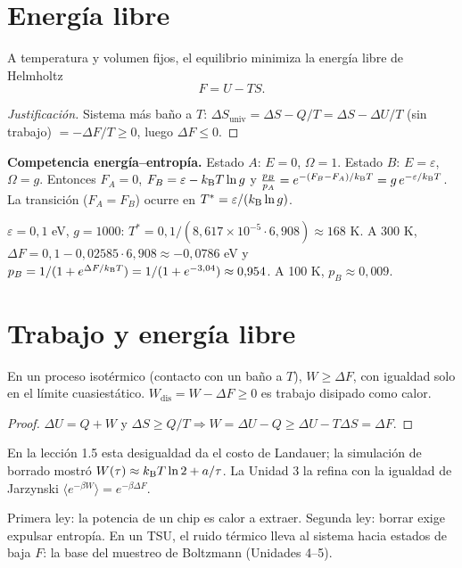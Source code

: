\documentclass[11pt,a4paper]{article}
\begin{document}
\section{Energía libre}
A temperatura y volumen fijos, el equilibrio minimiza la energía libre de Helmholtz
\begin{equation}F=U-TS .\end{equation}
\begin{proof}[Justificación]
Sistema más baño a $T$: $\Delta S_{\text{univ}}=\Delta S-Q/T=\Delta S-\Delta U/T$ (sin trabajo) $=-\Delta F/T\ge0$, luego $\Delta F\le0$.
\end{proof}
\textbf{Competencia energía--entropía.} Estado $A$: $E=0$, $\Omega=1$. Estado $B$: $E=\varepsilon$, $\Omega=g$. Entonces
$F_A=0$, $F_B=\varepsilon-k_{\mathrm B} T\ln g$ y $\frac{p_B}{p_A}=e^{-(F_B-F_A)/k_{\mathrm B} T}=g\,e^{-\varepsilon/k_{\mathrm B} T}$. La transición
($F_A=F_B$) ocurre en $T^*=\varepsilon/(k_{\mathrm B}\ln g)$.
\begin{ejemplo}
$\varepsilon=0{,}1$ eV, $g=1000$: $T^*=0{,}1/(8{,}617\times10^{-5}\cdot6{,}908)\approx168$ K. A 300 K,
$\Delta F=0{,}1-0{,}02585\cdot6{,}908\approx-0{,}0786$ eV y $p_B=1/(1+e^{\Delta F/k_{\mathrm B} T})=1/(1+e^{-3{,}04})\approx0{,}954$.
A 100 K, $p_B\approx0{,}009$.
\end{ejemplo}

\section{Trabajo y energía libre}
\begin{resultado}
En un proceso isotérmico (contacto con un baño a $T$), $W\ge\Delta F$, con igualdad solo en el límite cuasiestático.
$W_{\text{dis}}=W-\Delta F\ge0$ es trabajo disipado como calor.
\end{resultado}
\begin{proof}
$\Delta U=Q+W$ y $\Delta S\ge Q/T\Rightarrow W=\Delta U-Q\ge\Delta U-T\Delta S=\Delta F$.
\end{proof}
En la lección 1.5 esta desigualdad da el costo de Landauer; la simulación de borrado mostró $W(\tau)\approx k_{\mathrm B} T\ln2+a/\tau$.
La Unidad 3 la refina con la igualdad de Jarzynski $\langle e^{-\beta W}\rangle=e^{-\beta\Delta F}$.

\begin{aplicacion}
Primera ley: la potencia de un chip es calor a extraer. Segunda ley: borrar exige expulsar entropía. En un TSU, el
ruido térmico lleva al sistema hacia estados de baja $F$: la base del muestreo de Boltzmann (Unidades 4--5).
\end{aplicacion}
\end{document}
